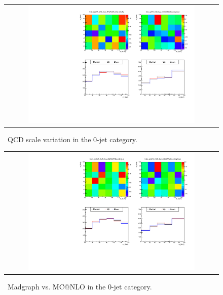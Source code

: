 %
\begin{figure}[htp]
\centering
\begin{tabular}{c}
\includegraphics[width=0.8\textwidth]{figures/histo_qqWW_CMS_hww_MVAWWNLOBounding_0j_zoom.pdf}
\end{tabular}
\caption{ \qqww\ QCD scale variation in the 0-jet category.}
\label{fig:alter_qqwwnlo}
\end{figure}
%
\begin{figure}[htp]
\centering
\begin{tabular}{c}
\includegraphics[width=0.8\textwidth]{figures/histo_qqWW_CMS_hww_MVAWWBounding_0j_zoom.pdf}
\end{tabular}
\caption{ \qqww\ Madgraph vs. MC@NLO in the 0-jet category.}
\label{fig:alter_qqww}
\end{figure}
%
